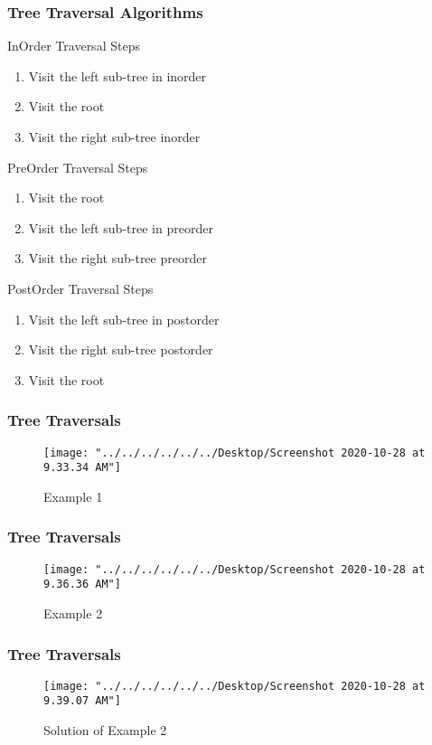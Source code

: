 \documentclass[11pt]{beamer}
\begin{document}
    \begin{frame}
    	\frametitle{Tree Traversal Algorithms}  	
    	\begin{block}{InOrder Traversal Steps}
    		\begin{enumerate}
    			\item Visit the left sub-tree in
    			inorder
    			\item Visit the root
    			\item Visit the right sub-tree inorder
    		\end{enumerate}
    	\end{block}   
    	\begin{block}{PreOrder Traversal Steps}
    		\begin{enumerate}
    			\item Visit the root
    			\item Visit the left sub-tree in
    			preorder
    			\item Visit the right sub-tree preorder
    		\end{enumerate}
    	\end{block}  
    	\begin{block}{PostOrder Traversal Steps}
    		\begin{enumerate}
    			\item Visit the left sub-tree in
    			postorder
    			\item Visit the right sub-tree postorder
    			\item Visit the root
    		\end{enumerate}
    	\end{block}  	
    \end{frame}
    
    \begin{frame}
    	\frametitle{Tree Traversals}  	
    	 \begin{figure}
    	 	\centering
    	 	\texttt{[image: "../../../../../../Desktop/Screenshot 2020-10-28 at 9.33.34 AM"]}
    	 	\caption{Example 1}
    	 	\label{fig:screenshot-2020-10-28-at-9}
    	 \end{figure} 	 
    \end{frame}

      \begin{frame}
    	\frametitle{Tree Traversals}  	
    	\begin{figure}
    		\centering
    		\texttt{[image: "../../../../../../Desktop/Screenshot 2020-10-28 at 9.36.36 AM"]}
    		\caption{Example 2}
    		\label{fig:screenshot-2020-10-28-at-9}
    	\end{figure}	 
    \end{frame}
    
     \begin{frame}
    	\frametitle{Tree Traversals}  	
    	\begin{figure}
    		\centering
    		\texttt{[image: "../../../../../../Desktop/Screenshot 2020-10-28 at 9.39.07 AM"]}
    		\caption{Solution of Example 2}
    		\label{fig:screenshot-2020-10-28-at-9}
    	\end{figure}
    	
    \end{frame}
\end{document}
